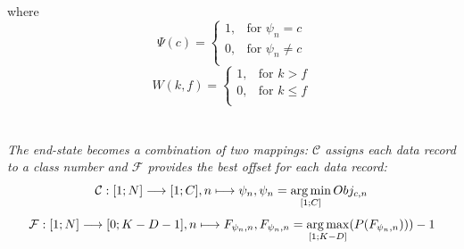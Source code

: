 where
\begin{equation}
    \Psi(c) = 
    \begin{cases}
        1, & \text{for } \psi_n = c \\
        0, & \text{for } \psi_n \neq c\\
    \end{cases}
\end{equation}
\begin{equation}
    W(k,f) = 
    \begin{cases}
        1, & \text{for } k > f\\
        0, & \text{for } k \leq f\\
    \end{cases}
\end{equation}\\\\
\textit{The end-state becomes a combination of two mappings: $\mathcal{C}$ assigns each data record to a class number and $\mathcal{F}$ provides the best offset for each data record:}
\begin{equation}
    \mathcal{C} : [1;N] \longrightarrow [1;C],  n \longmapsto \psi_n, \psi_n = \operatorname*{arg\,min}_{[1;C]}Obj_{c,n}
\end{equation}
\begin{equation}
    \mathcal{F} : [1;N] \longrightarrow [0;K-D-1],  n \longmapsto F_{\psi_n,n}, F_{\psi_n,n} = \operatorname*{arg\,max}_{[1;K-D]}(P(F_{\psi_n,n})))-1
\end{equation}

\newpage